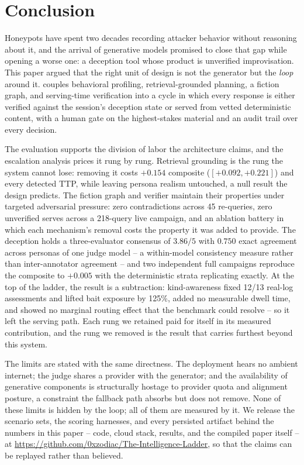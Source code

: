 \section{Conclusion}
\label{sec:conclusion}

Honeypots have spent two decades recording attacker behavior without
reasoning about it, and the arrival of generative models promised to close
that gap while opening a worse one: a deception tool whose product is
unverified improvisation. This paper argued that the right unit of design
is not the generator but the \emph{loop} around it. \system couples
behavioral profiling, retrieval-grounded planning, a fiction graph, and
serving-time verification into a cycle in which every response is either
verified against the session's deception state or served from vetted
deterministic content, with a human gate on the highest-stakes material
and an audit trail over every decision.

The evaluation supports the division of labor the architecture claims,
and the escalation analysis prices it rung by rung. Retrieval grounding
is the rung the system cannot lose: removing
it costs $+0.154$ composite ($[+0.092, +0.221]$) and every detected TTP,
while leaving persona realism untouched, a null result the design predicts.
The fiction graph and verifier maintain their properties under targeted
adversarial pressure: zero contradictions across 45 re-queries, zero
unverified serves across a 218-query live campaign, and an ablation
battery in which each mechanism's removal costs the property it was added
to provide. The deception holds a three-evaluator consensus of $3.86/5$ with
$0.750$ exact agreement across personas of one judge model -- a
within-model consistency measure rather than inter-annotator agreement
-- and two independent full campaigns reproduce the
composite to $+0.005$ with the deterministic strata replicating exactly.
At the top of the ladder, the result is a subtraction:
kind-awareness fixed 12/13 real-log assessments and lifted bait exposure
by 125\%, added no measurable dwell time, and showed no marginal routing
effect that the benchmark could resolve -- so it left the serving path.
Each rung we retained paid for itself in its measured contribution, and
the rung we removed is the result that carries furthest beyond this
system.

The limits are stated with the same directness. The deployment hears no ambient
internet; the judge shares a provider with the generator; and the
availability of generative components is structurally hostage to provider
quota and alignment posture, a constraint the fallback path absorbs but
does not remove. None of these limits is hidden by the loop; all of them
are measured by it. We release the scenario sets, the scoring harnesses,
and every persisted artifact behind the numbers in this paper -- code,
cloud stack, results, and the compiled paper itself -- at
\url{https://github.com/0xzodiac/The-Intelligence-Ladder}, so that the
claims can be replayed rather than believed.

